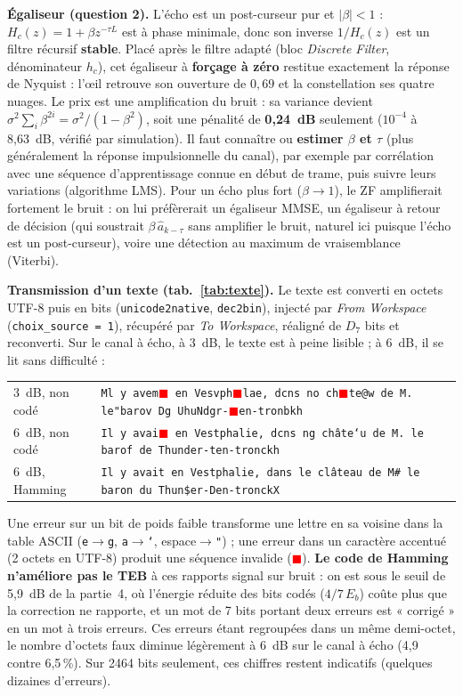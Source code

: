 \documentclass[10pt,a4paper]{article}
\newcommand{\code}[1]{\texttt{\small #1}}
\newcommand{\bloc}[1]{\textit{#1}}
\newcommand{\err}{\textcolor{red}{\ensuremath{\blacksquare}}}   %
\begin{document}
\textbf{Égaliseur (question 2).} L'écho est un post-curseur pur et $|\beta| < 1$ : $H_c(z) = 1 + \beta z^{-\tau L}$ est à phase minimale, donc son inverse $1/H_c(z)$ est un filtre récursif \textbf{stable}. Placé après le filtre adapté (bloc \bloc{Discrete Filter}, dénominateur $h_c$), cet égaliseur à \textbf{forçage à zéro} restitue exactement la réponse de Nyquist : l'œil retrouve son ouverture de $0,69$ et la constellation ses quatre nuages. Le prix est une amplification du bruit : sa variance devient $\sigma^2\sum_i \beta^{2i} = \sigma^2/(1-\beta^2)$, soit une pénalité de \textbf{0,24~dB} seulement ($10^{-4}$ à 8,63~dB, vérifié par simulation). Il faut connaître ou \textbf{estimer $\beta$ et $\tau$} (plus généralement la réponse impulsionnelle du canal), par exemple par corrélation avec une séquence d'apprentissage connue en début de trame, puis suivre leurs variations (algorithme LMS). Pour un écho plus fort ($\beta \to 1$), le ZF amplifierait fortement le bruit : on lui préfèrerait un égaliseur MMSE, un égaliseur à retour de décision (qui soustrait $\beta\,\hat a_{k-\tau}$ sans amplifier le bruit, naturel ici puisque l'écho est un post-curseur), voire une détection au maximum de vraisemblance (Viterbi).

\textbf{Transmission d'un texte (tab.~\ref{tab:texte}).} Le texte est converti en octets UTF-8 puis en bits (\code{unicode2native}, \code{dec2bin}), injecté par \bloc{From Workspace} (\code{choix\_source = 1}), récupéré par \bloc{To Workspace}, réaligné de $D_7$ bits et reconverti. Sur le canal à écho, à 3~dB, le texte est à peine lisible ; à 6~dB, il se lit sans difficulté :
\begin{center}\small
\begin{tabular}{@{}l@{\hspace{3mm}}l@{}}
3~dB, non codé & \texttt{Ml y avem\err{} en Vesvph\err{}lae, dcns no ch\err{}te@w de M. le"barov Dg UhuNdgr-\err{}en-tronbkh} \\
6~dB, non codé & \texttt{Il y avai\err{} en Vestphalie, dcns ng châte`u de M. le barof de Thunder-ten-tronckh} \\
6~dB, Hamming  & \texttt{Il y avait en Vestphalie, dans le clâteau de M\# le baron du Thun\$er-Den-tronckX}
\end{tabular}
\end{center}
Une erreur sur un bit de poids faible transforme une lettre en sa voisine dans la table ASCII (\texttt{e}$\to$\texttt{g}, \texttt{a}$\to$\texttt{`}, espace$\to$\texttt{"}) ; une erreur dans un caractère accentué (2 octets en UTF-8) produit une séquence invalide (\err). \textbf{Le code de Hamming n'améliore pas le TEB} à ces rapports signal sur bruit : on est sous le seuil de 5,9~dB de la partie~4, où l'énergie réduite des bits codés ($4/7\,E_b$) coûte plus que la correction ne rapporte, et un mot de 7 bits portant deux erreurs est « corrigé » en un mot à trois erreurs. Ces erreurs étant regroupées dans un même demi-octet, le nombre d'octets faux diminue légèrement à 6~dB sur le canal à écho (4,9 contre 6,5\,\%). Sur 2464 bits seulement, ces chiffres restent indicatifs (quelques dizaines d'erreurs).
\end{document}
